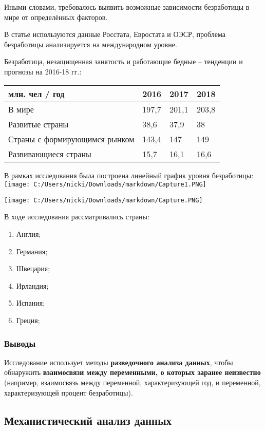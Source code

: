 \documentclass[
]{article}
\providecommand{\tightlist}{%
  \setlength{\itemsep}{0pt}\setlength{\parskip}{0pt}}
\begin{document}
Иными словами, требовалось выявить возможные зависимости безработицы в
мире от определённых факторов.

В статье используются данные Росстата, Евростата и ОЭСР, проблема
безработицы анализируется на международном уровне.

Безработица, незащищенная занятость и работающие бедные -- тенденции и
прогнозы на 2016-18 гг.:

\begin{longtable}[]{@{}llll@{}}
\toprule
млн. чел / год & 2016 & 2017 & 2018 \\
\midrule
\endhead
В мире & 197,7 & 201,1 & 203,8 \\
Развитые страны & 38,6 & 37,9 & 38 \\
Страны с формирующимся рынком & 143,4 & 147 & 149 \\
Развивающиеся страны & 15,7 & 16,1 & 16,6 \\
\bottomrule
\end{longtable}

В рамках исследования была построена линейный график уровня безработицы:
\texttt{[image: C:/Users/nicki/Downloads/markdown/Capture1.PNG]}

\texttt{[image: C:/Users/nicki/Downloads/markdown/Capture.PNG]}

В ходе исследования рассматривались страны:

\begin{enumerate}
\def\labelenumi{\arabic{enumi}.}
\tightlist
\item
  Англия;
\item
  Германия;
\item
  Швецария;
\item
  Ирландия;
\item
  Испания;
\item
  Греция;
\end{enumerate}

\hypertarget{ux432ux44bux432ux43eux434ux44b}{%
\subsubsection{Выводы}\label{ux432ux44bux432ux43eux434ux44b}}

Исследование использует методы \textbf{разведочного анализа данных},
чтобы обнаружить \textbf{взаимосвязи между переменными, о которых
заранее неизвестно} (например, взаимосвязь между переменной,
характеризующей год, и переменной, характеризующей процент безработицы).

\hypertarget{ux43cux435ux445ux430ux43dux438ux441ux442ux438ux447ux435ux441ux43aux438ux439-ux430ux43dux430ux43bux438ux437-ux434ux430ux43dux43dux44bux445}{%
\subsection{Механистический анализ
данных}\label{ux43cux435ux445ux430ux43dux438ux441ux442ux438ux447ux435ux441ux43aux438ux439-ux430ux43dux430ux43bux438ux437-ux434ux430ux43dux43dux44bux445}}
\end{document}
